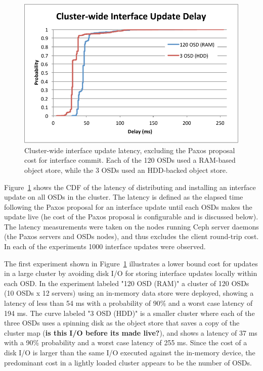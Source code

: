 \documentclass[10pt,twocolumn]{article}
\begin{document}
\begin{figure}[h]
\centering
\includegraphics{figures/iface-update-delay.pdf}
\caption{Cluster-wide interface update latency, excluding the Paxos proposal cost for
interface commit. Each of the 120 OSDs used a RAM-based object store, while the
3 OSDs used an HDD-backed object store.}
\label{fig:propdelay}
\end{figure}

Figure~\ref{fig:propdelay} shows the CDF of the latency of distributing and
installing an interface update on all OSDs in the cluster. The latency is
defined as the elapsed time following the Paxos proposal for an interface
update until each OSDs makes the update live (he cost of the Paxos proposal is
configurable and is discussed below). The latency measurements were taken on
the nodes running Ceph server daemons (the Paxos servers and OSDs nodes), and
thus excludes the client round-trip cost. In each of the experiments 1000
interface updates were observed.

The first experiment shown in Figure~\ref{fig:propdelay} illustrates a lower
bound cost for updates in a large cluster by avoiding disk I/O for storing
interface updates locally within each OSD.  In the experiment labeled "120 OSD
(RAM)" a cluster of 120 OSDs (10 OSDs x 12 servers) using an in-memory data
store were deployed, showing a latency of less than 54 ms with a probability of
90\% and a worst case latency of 194 ms. The curve labeled "3 OSD (HDD)" is a
smaller cluster where each of the three OSDs uses a spinning disk as the object
store that saves a copy of the cluster map ({\bf is this I/O before its made
live?}), and shows a latency of 37 ms with a 90\% probability and a worst case
latency of 255 ms. Since the cost of a disk I/O is larger than the same I/O
executed against the in-memory device, the predominant cost in a lightly loaded
cluster appears to be the number of OSDs.
\end{document}
